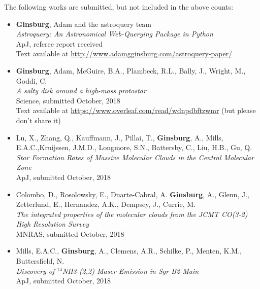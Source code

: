 \vspace{24pt}
The following works are submitted, but not included in the above counts:

\begin{itemize}
    \item \textbf{Ginsburg}, Adam and the astroquery team \\
        \textit{Astroquery: An Astronomical Web-Querying Package in Python} \\
ApJ, referee report received \\ 
Text available at \url{http://www.adamgginsburg.com/astroquery-paper/}

    \item \textbf{Ginsburg}, Adam, McGuire, B.A., Plambeck, R.L., Bally, J., Wright, M., Goddi, C. \\
        \textit{A salty disk around a high-mass protostar} \\
Science, submitted October, 2018 \\
Text available at \url{https://www.overleaf.com/read/wdnpdbftzwmr} (but please don't share it)

\item Lu, X., Zhang, Q., Kauffmann, J.,  Pillai, T.,  
    \textbf{Ginsburg}, A.,  Mills, E.A.C.,Kruijssen, J.M.D., 
    Longmore, S.N.,  Battersby, C.,   Liu, H.B.,  Gu, Q. \\
    \textit{Star Formation Rates of Massive Molecular Clouds in the Central Molecular Zone}\\
    ApJ, submitted October, 2018

\item Colombo, D.,   Rosolowsky, E., Duarte-Cabral, A. \textbf{Ginsburg}, A.,
    Glenn, J.,  Zetterlund, E., Hernandez, A.K., Dempsey, J., Currie, M. \\
    \textit{The integrated properties of the molecular clouds from the JCMT CO(3-2) High Resolution Survey} \\
    MNRAS, submitted October, 2018
    
\item Mills, E.A.C., \textbf{Ginsburg}, A., Clemens, A.R., Schilke, P., Menten, K.M., Buttersfield, N. \\
    \textit{Discovery of $^{14}$NH3 (2,2) Maser Emission in Sgr B2-Main} \\
    ApJ, submitted October, 2018

\end{itemize}
